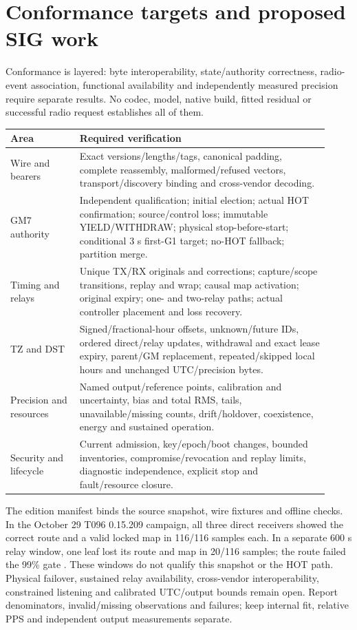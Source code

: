 \documentclass[11pt,letterpaper]{article}
\begin{document}
\section{Conformance targets and proposed SIG work}
Conformance is layered: byte interoperability, state/authority correctness, radio-event association, functional availability and independently measured precision require separate results. No codec, model, native build, fitted residual or successful radio request establishes all of them.
\begin{center}\small
\begin{tabular}{@{}L{0.20\linewidth}L{0.72\linewidth}@{}}\toprule
Area & Required verification\\\midrule
Wire and bearers & Exact versions/lengths/tags, canonical padding, complete reassembly, malformed/refused vectors, transport/discovery binding and cross-vendor decoding.\\
GM7 authority & Independent qualification; initial election; actual HOT confirmation; source/control loss; immutable YIELD/WITHDRAW; physical stop-before-start; conditional 3 s first-G1 target; no-HOT fallback; partition merge.\\
Timing and relays & Unique TX/RX originals and corrections; capture/scope transitions, replay and wrap; causal map activation; original expiry; one- and two-relay paths; actual controller placement and loss recovery.\\
TZ and DST & Signed/fractional-hour offsets, unknown/future IDs, ordered direct/relay updates, withdrawal and exact lease expiry, parent/GM replacement, repeated/skipped local hours and unchanged UTC/precision bytes.\\
Precision and resources & Named output/reference points, calibration and uncertainty, bias and total RMS, tails, unavailable/missing counts, drift/holdover, coexistence, energy and sustained operation.\\
Security and lifecycle & Current admission, key/epoch/boot changes, bounded inventories, compromise/revocation and replay limits, diagnostic independence, explicit stop and fault/resource closure.\\
\bottomrule\end{tabular}\end{center}

The edition manifest binds the source snapshot, wire fixtures and offline checks. In the October 29 T096 0.15.209 campaign, all three direct receivers showed the correct route and a valid locked map in 116/116 samples each. In a separate 600 s relay window, one leaf lost its route and map in 20/116 samples; the route failed the 99\% gate \cite{auto}. These windows do not qualify this snapshot or the HOT path. Physical failover, sustained relay availability, cross-vendor interoperability, constrained listening and calibrated UTC/output bounds remain open. Report denominators, invalid/missing observations and failures; keep internal fit, relative PPS and independent output measurements separate.
\end{document}
